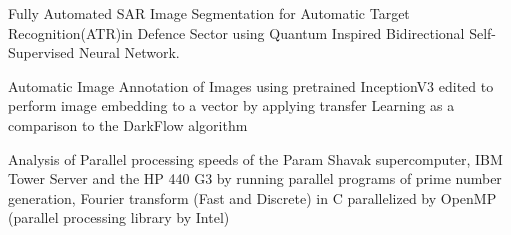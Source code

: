 \documentclass[]{imman_resume}
\begin{document}
\begin{minipage}[t]{0.66\textwidth}
Fully Automated SAR Image Segmentation for Automatic Target Recognition(ATR)in Defence Sector using Quantum Inspired  Bidirectional Self-Supervised Neural
Network.
\sectionsep

Automatic Image Annotation of Images using pretrained InceptionV3 edited to perform image embedding to a vector by applying transfer Learning as a comparison to the DarkFlow algorithm 
\sectionsep

Analysis of Parallel processing speeds of the Param Shavak supercomputer, IBM Tower Server and the HP 440 G3 by running parallel programs of prime number generation, Fourier transform (Fast and Discrete) in C parallelized by OpenMP (parallel processing library by Intel)
\sectionsep

\end{minipage} 

\newpage


\begin{minipage}[t]{0.38\textwidth}
\end{minipage}
\end{document}
